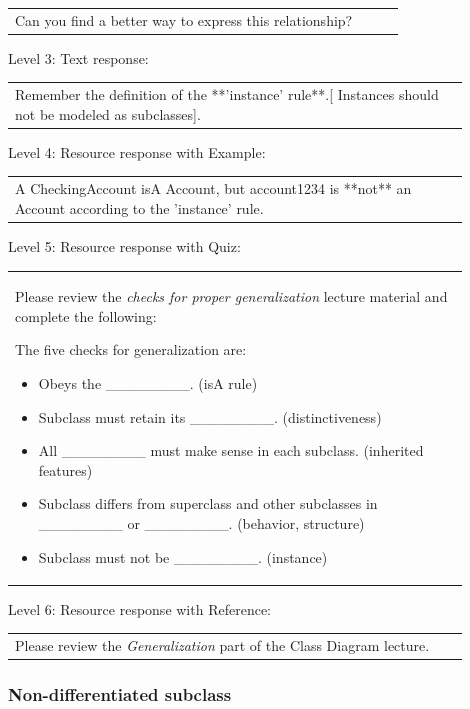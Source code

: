 \begin{tabular}{|p{0.9\linewidth}}
Can you find a better way to express this relationship?
\end{tabular} \medskip

\noindent Level 3: Text response: \medskip

\begin{tabular}{|p{0.9\linewidth}}
Remember the definition of the **'instance' rule**.[ Instances should not be modeled as subclasses].
\end{tabular} \medskip

\noindent Level 4: Resource response with Example: \medskip

\begin{tabular}{|p{0.9\linewidth}}
A CheckingAccount isA Account, but account1234 is **not** an Account according to the 'instance' rule.
\end{tabular} \medskip

\noindent Level 5: Resource response with Quiz: \medskip

\begin{tabular}{|p{0.9\linewidth}}
Please review the \textit{checks for proper generalization} lecture material
and complete the following:

The five checks for generalization are:
\begin{itemize}
    \item Obeys the \_\_\_\_\_\_\_\_. (isA rule)
    \item Subclass must retain its \_\_\_\_\_\_\_\_. (distinctiveness)
    \item All \_\_\_\_\_\_\_\_ must make sense in each subclass. (inherited features)
    \item Subclass differs from superclass and other subclasses in \_\_\_\_\_\_\_\_ or \_\_\_\_\_\_\_\_. (behavior, structure)
    \item Subclass must not be \_\_\_\_\_\_\_\_. (instance)
\end{itemize}

\end{tabular} \medskip

\noindent Level 6: Resource response with Reference: \medskip

\begin{tabular}{|p{0.9\linewidth}}
Please review the \textit{Generalization} part of the Class Diagram lecture.
\end{tabular} \medskip


\subsubsection{Non-differentiated subclass}

